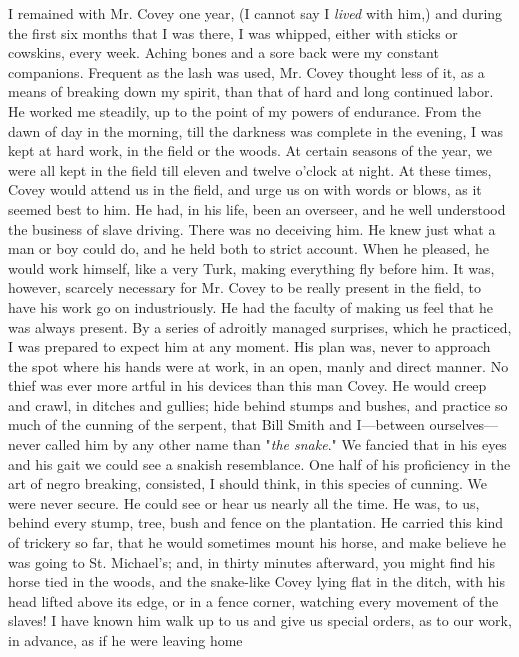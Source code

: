 I remained with Mr. Covey one year, (I cannot say I \emph{lived} with
him,) and during the first six months that I was there, I was whipped,
either with sticks or cowskins, every week. Aching bones and a sore back
{\protect\hypertarget{215}{}{}}were my constant companions. Frequent as
the lash was used, Mr. Covey thought less of it, as a means of breaking
down my spirit, than that of hard and long continued labor. He worked me
steadily, up to the point of my powers of endurance. From the dawn of
day in the morning, till the darkness was complete in the evening, I was
kept at hard work, in the field or the woods. At certain seasons of the
year, we were all kept in the field till eleven and twelve o'clock at
night. At these times, Covey would attend us in the field, and urge us
on with words or blows, as it seemed best to him. He had, in his life,
been an overseer, and he well understood the business of slave driving.
There was no deceiving him. He knew just what a man or boy could do, and
he held both to strict account. When he pleased, he would work himself,
like a very Turk, making everything fly before him. It was, however,
scarcely necessary for Mr. Covey to be really present in the field, to
have his work go on industriously. He had the faculty of making us feel
that he was always present. By a series of adroitly managed surprises,
which he practiced, I was prepared to expect him at any moment. His plan
was, never to approach the spot where his hands were at work, in an
open, manly and direct manner. No thief was ever more artful in his
devices than this man Covey. He would creep and crawl, in ditches and
gullies; hide behind stumps and bushes, and practice so much of the
cunning of the serpent, that Bill Smith and I---between
ourselves---never called him by any other name than "\emph{the snake}."
We fancied that in his eyes and his gait we could see a
{\protect\hypertarget{216}{}{}}snakish resemblance. One half of his
proficiency in the art of negro breaking, consisted, I should think, in
this species of cunning. We were never secure. He could see or hear us
nearly all the time. He was, to us, behind every stump, tree, bush and
fence on the plantation. He carried this kind of trickery so far, that
he would sometimes mount his horse, and make believe he was going to St.
Michael's; and, in thirty minutes afterward, you might find his horse
tied in the woods, and the snake-like Covey lying flat in the ditch,
with his head lifted above its edge, or in a fence corner, watching
every movement of the slaves! I have known him walk up to us and give us
special orders, as to our work, in advance, as if he were leaving home
